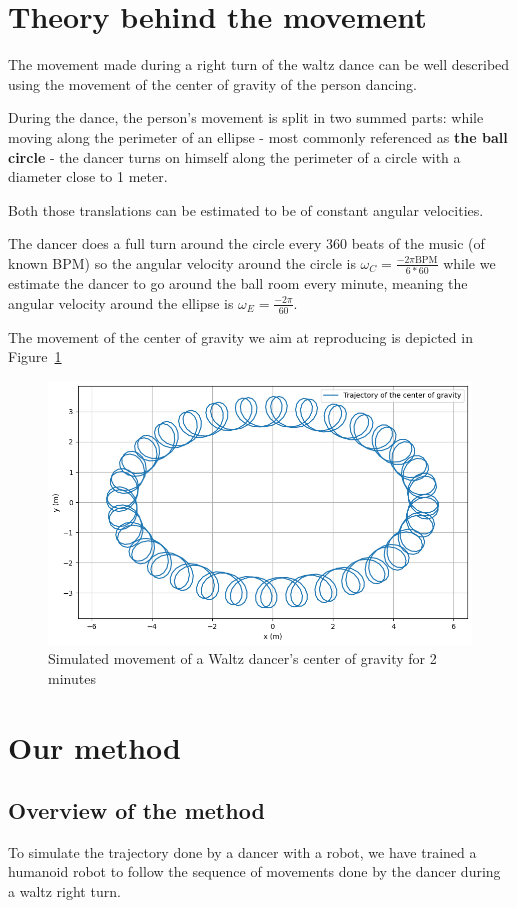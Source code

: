 \documentclass{amsart}
\theoremstyle{definition}
\theoremstyle{plain}
\begin{document}
\section{Theory behind the movement}


The movement made during a right turn of the waltz dance can be well described using the movement of the center of gravity of the person dancing. 

During the dance, the person's movement is split in two summed parts: while moving along the perimeter of an ellipse - most commonly referenced as \textbf{the ball circle} - the dancer turns on himself along the perimeter of a circle with a diameter close to 1 meter.

Both those translations can be estimated to be of constant angular velocities.

The dancer does a full turn around the circle every 360 beats of the music (of known BPM) so the angular velocity around the circle is $\omega_C = \frac{-2\pi \text{BPM}}{6*60}$ while we estimate the dancer to go around the ball room every minute, meaning the angular velocity around the ellipse is $\omega_E = \frac{-2\pi}{60}$. 

The movement of the center of gravity we aim at reproducing is depicted in Figure~\ref{fig:cog_movement}

\begin{figure}
  \centering
  \includegraphics[width = 0.5 \columnwidth]{img/waltz_cog_movement.png} 
  \caption{Simulated movement of a Waltz dancer's center of gravity for 2 minutes}\label{fig:cog_movement}
\end{figure}

\section{Our method}


\subsection{Overview of the method}
To simulate the trajectory done by a dancer with a robot, we have trained a humanoid robot to follow the sequence of movements done by the dancer during a waltz right turn.
\end{document}
